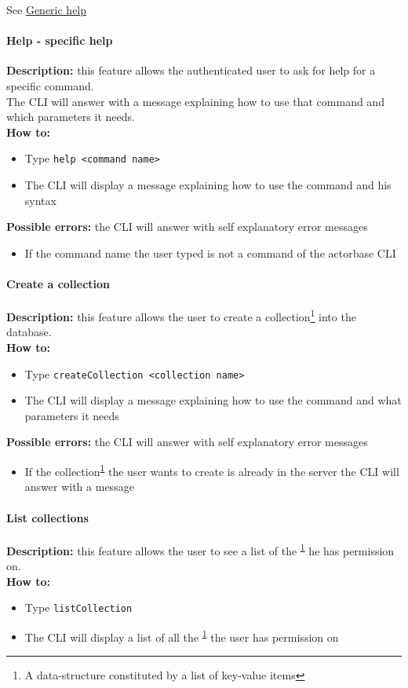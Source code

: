 \documentclass{scalatekids-article}
\begin{document}
See \hyperref[sec:generichelp]{Generic help}

\paragraph{Help - specific help}
\label{sec:specifichelp}
\textbf{Description:} this feature allows the authenticated user to ask for help for
a specific command.\\
The CLI will answer with a message explaining how to use that command and
which parameters it needs.\\
\textbf{How to:}
\begin{itemize}
\item Type \texttt{help <command name>}
\item The CLI will display a message explaining how to use the command and his syntax
\end{itemize}
\textbf{Possible errors:} the CLI will answer with self explanatory error messages
\begin{itemize}
\item If the command name the user typed is not a command of the actorbase CLI
\end{itemize}

\paragraph{Create a collection}
\label{sec:createcollection}
\textbf{Description:} this feature allows the user to create a
collection\footnote{A data-structure constituted by a list of key-value items\label{coll}} into the database.\\
\textbf{How to:}
\begin{itemize}
\item Type \texttt{createCollection <collection name>}
\item The CLI will display a message explaining how to use the command and what parameters it needs
\end{itemize}
\textbf{Possible errors:} the CLI will answer with self explanatory error messages
\begin{itemize}
\item If the collection\textsuperscript{\ref{coll}} the user wants to create is already in the server the CLI will answer with a message
\end{itemize}

\paragraph{List collections}
\label{sec:listcollection}
\textbf{Description:} this feature allows the user to see a list of
the \textsuperscript{\ref{coll}} he has permission on.\\
\textbf{How to:}
\begin{itemize}
\item Type \texttt{listCollection}
\item The CLI will display a list of all the \textsuperscript{\ref{coll}} the user has
  permission on
\end{itemize}
\end{document}
